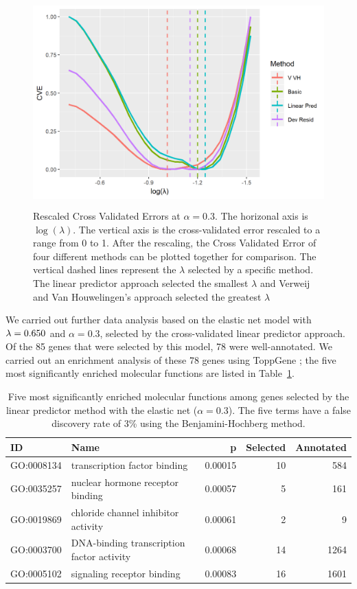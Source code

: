 \begin{figure}[h]
  \centering
  \includegraphics[height= 8cm ]{./manuscript_figure/shedden.png}
  \caption{\label{fig:CVE}Rescaled Cross Validated Errors at $\alpha = 0.3$. The horizonal axis is $\log(\lambda)$. The vertical axis is the cross-validated error rescaled to a range from 0 to 1. After the rescaling, the Cross Validated Error of four different methods can be plotted together for comparison. The vertical dashed lines represent the $\lambda$ selected by a specific method. The linear predictor approach selected the smallest $\lambda$ and Verweij and Van Houwelingen's approach selected the greatest $\lambda$}
\end{figure}

We carried out further data analysis based on the elastic net model with $\lambda = 0.650$ and $\alpha = 0.3$, selected by the cross-validated linear predictor approach. Of the 85 genes that were selected by this model, 78 were well-annotated.  We carried out an enrichment analysis of these 78 genes using ToppGene \citep{Chen2009c}; the five most significantly enriched molecular functions are listed in Table~\ref{Tab:go}.

\begin{table}[ht]
\centering
\caption{\label{Tab:go} Five most significantly enriched molecular functions among genes selected by the linear predictor method with the elastic net ($\alpha=0.3$).  The five terms have a false discovery rate of 3\% using the Benjamini-Hochberg method. }
\begin{tabular}{llrrr}
\toprule
ID & Name & p & Selected & Annotated\\
\midrule
GO:0008134 & transcription factor binding & 0.00015 & 10 & 584\\
GO:0035257 & nuclear hormone receptor binding & 0.00057 & 5 & 161\\
GO:0019869 & chloride channel inhibitor activity & 0.00061 & 2 & 9\\
GO:0003700 & DNA-binding transcription factor activity & 0.00068 & 14 & 1264\\
GO:0005102 & signaling receptor binding & 0.00083 & 16 & 1601\\
\bottomrule
\end{tabular}
\end{table}

